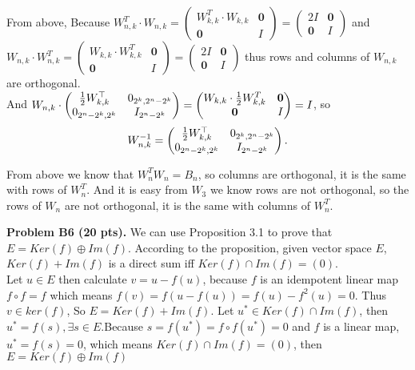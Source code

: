 \documentclass[12pt]{article}
\begin{document}
\medskip
From above, 
Because $W_{n,k}^T \cdot W_{n,k} = 
\begin{pmatrix}
W_{k,k}^T \cdot W_{k,k} &\mathbf{0} \\
\mathbf{0} &I
\end{pmatrix} = 
\begin{pmatrix}
2I &\mathbf{0} \\
\mathbf{0} &I
\end{pmatrix}  
$ and \\
$W_{n,k} \cdot W_{n,k}^T = 
\begin{pmatrix}
W_{k,k}\cdot W_{k,k}^T &\mathbf{0} \\
\mathbf{0} &I
\end{pmatrix} = 
\begin{pmatrix}
2I &\mathbf{0} \\
\mathbf{0} &I
\end{pmatrix}  
$ thus rows and columns of $W_{n,k}$ are orthogonal. \\
And 
$W_{n,k} \cdot \begin{pmatrix}
 \frac{1}{2}W_{k, k}^{\top} & 0_{2^{k}, 2^{n} - 2^{k}} \\
0_{2^{n}- 2^{k}, 2^k} &  I_{2^{n} - 2^{k}}
\end{pmatrix} = 
\begin{pmatrix}
W_{k,k}\cdot \frac{1}{2} W_{k,k}^T &\mathbf{0} \\
\mathbf{0} &I
\end{pmatrix} =
I
$, so 
\[
W_{n, k}^{-1} = 
\begin{pmatrix}
 \frac{1}{2}W_{k, k}^{\top} & 0_{2^{k}, 2^{n} - 2^{k}} \\
0_{2^{n}- 2^{k}, 2^k} &  I_{2^{n} - 2^{k}}
\end{pmatrix}.
\]

From above we know that $W_n^TW_n = B_n$, so columns are orthogonal, it is the same with rows of $W_n^T$. And it is easy from $W_3$ we know rows are not orthogonal, so the rows of $W_n$ are not orthogonal, it is the same with columns of $W_n^T$.

\vspace {0.25cm}\noindent
{\bf Problem B6 (20 pts).}
We can use Proposition 3.1 to prove that $E=Ker(f)\oplus Im(f)$.
According to the proposition, given vector space $E$, $Ker(f)+Im(f)$
is a direct sum iff $Ker(f)\cap Im(f)=(0)$. \\
Let $u \in E$ then calculate $v = u - f(u)$, because $f$ is an idempotent linear map $f \circ f = f$ which means $f(v) = f(u - f(u)) = f(u) - f^2(u) = 0$. Thus $v \in ker(f)$, So $E = Ker(f) + Im(f)$. Let $u^* \in Ker(f) \cap Im(f)$, then $u^* = f(s), \exists s \in E$.Because $s = f(u^*) = f \circ f(u^*) = 0$ and $f$ is a linear map, $u^* = f(s) = 0$, which means $Ker(f) \cap Im(f)=(0)$, then $E = Ker(f) \oplus Im(f)$
\end{document}
